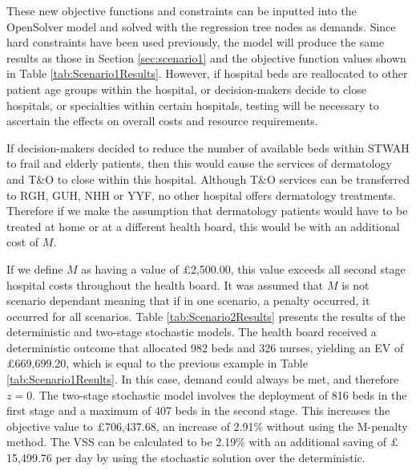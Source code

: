 \documentclass[../thesis.tex]{subfiles}
\begin{document}
These new objective functions and constraints can be inputted into the OpenSolver model and solved with the regression tree nodes as demands. Since hard constraints have been used previously, the model will produce the same results as those in Section \ref{sec:scenario1} and the objective function values shown in Table \ref{tab:Scenario1Results}. However, if hospital beds are reallocated to other patient age groups within the hospital, or decision-makers decide to close hospitals, or specialties within certain hospitals, testing will be necessary to ascertain the effects on overall costs and resource requirements.

If decision-makers decided to reduce the number of available beds within STWAH to frail and elderly patients, then this would cause the services of dermatology and T\&O to close within this hospital. Although T\&O services can be transferred to RGH, GUH, NHH or YYF, no other hospital offers dermatology treatments. Therefore if we make the assumption that dermatology patients would have to be treated at home or at a different health board, this would be with an additional cost of $M$.

If we define $M$ as having a value of $\pounds$2,500.00, this value exceeds all second stage hospital costs throughout the health board. It was assumed that $M$ is not scenario dependant meaning that if in one scenario, a penalty occurred, it occurred for all scenarios. Table \ref{tab:Scenario2Results} presents the results of the deterministic and two-stage stochastic models. The health board received a deterministic outcome that allocated 982 beds and 326 nurses, yielding an EV of $\pounds$669,699.20, which is equal to the previous example in Table \ref{tab:Scenario1Results}. In this case, demand could always be met, and therefore $z=0$.
The two-stage stochastic model involves the deployment of 816 beds in the first stage and a maximum of 407 beds in the second stage. This increases the objective value to $\pounds$706,437.68, an increase of 2.91\% without using the M-penalty method. The VSS can be calculated to be 2.19\% with an additional saving of $\pounds$15,499.76 per day by using the stochastic solution over the deterministic.
\end{document}
